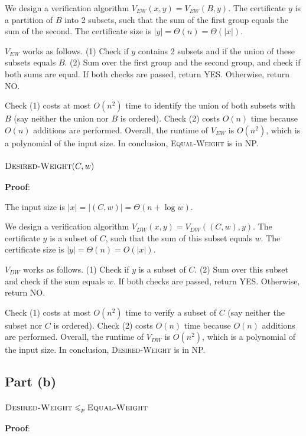 \documentclass{article}
\begin{document}
We design a verification algorithm $V_{EW}(x,y)=V_{EW}(B,y)$. The certificate $y$ is a partition of $B$ into 2 subsets, such that the sum of the first group equals the sum of the second. The certificate size is $|y|=\Theta(n)=\Theta(|x|)$.

$V_{EW}$ works as follows. (1) Check if $y$ contains 2 subsets and if the union of these subsets equals $B$. (2) Sum over the first group and the second group, and check if both sums are equal. If both checks are passed, return YES. Otherwise, return NO.

Check (1) costs at most $O(n^2)$ time to identify the union of both subsets with $B$ (say neither the union nor $B$ is ordered). Check (2) costs $O(n)$ time because $O(n)$ additions are performed. Overall, the runtime of $V_{EW}$ is $O(n^2)$, which is a polynomial of the input size. In conclusion, \textsc{Equal-Weight} is in NP.

\subsubsection{$\textsc{Desired-Weight}(C,w)$}
\noindent\textbf{Proof}:

The input size is $|x|=|(C,w)|=\Theta(n+\log w)$.

We design a verification algorithm $V_{DW}(x,y)=V_{DW}((C,w),y)$. The certificate $y$ is a subset of $C$, such that the sum of this subset equals $w$. The certificate size is $|y|=\Theta(n)=O(|x|)$.

$V_{DW}$ works as follows. (1) Check if $y$ is a subset of $C$. (2) Sum over this subset and check if the sum equals $w$. If both checks are passed, return YES. Otherwise, return NO.

Check (1) costs at most $O(n^2)$ time to verify a subset of $C$ (say neither the subset nor $C$ is ordered). Check (2) costs $O(n)$ time because $O(n)$ additions are performed. Overall, the runtime of $V_{DW}$ is $O(n^2)$, which is a polynomial of the input size. In conclusion, \textsc{Desired-Weight} is in NP.

\subsection{Part (b)}
\subsubsection{$\textsc{Desired-Weight}\leqslant_p\textsc{Equal-Weight}$}
\noindent\textbf{Proof}:
\end{document}
